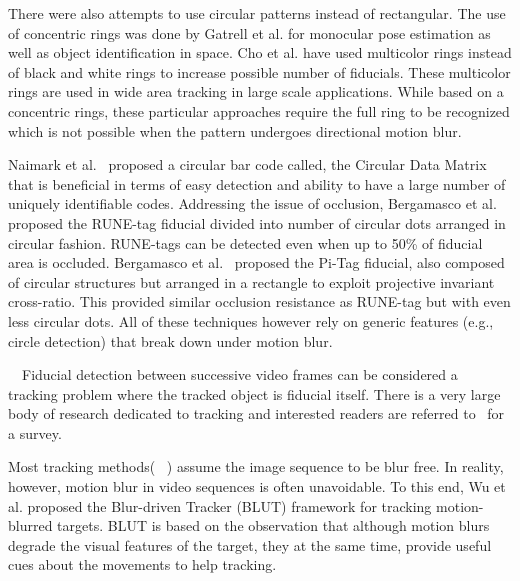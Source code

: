 \documentclass[runningheads]{llncs}
\begin{document}
There were also attempts to use circular patterns instead of rectangular. 
The use of concentric rings was done  by Gatrell et al.\cite{concentric}
for monocular pose estimation as well as object identification in space. Cho et al.
\cite{Cho:2001,Cho97fastcolor} have used multicolor rings instead of
black and white rings\cite{concentric} to increase possible number of fiducials.
These multicolor rings are used in wide area tracking in large scale
applications.  While based on a concentric rings, these particular approaches require 
the full ring to be recognized which is not possible when the pattern undergoes directional
motion blur.

Naimark et al.~\cite{NaimarkF02} proposed a circular bar code
called, the Circular Data Matrix that is beneficial in terms of
easy detection and ability to have a large number
of uniquely identifiable codes.  Addressing the issue of occlusion, 
Bergamasco et al. \cite{runetag11} proposed the RUNE-tag fiducial divided into number of
circular dots arranged in circular fashion.
RUNE-tags can be detected even when up to 50\% of fiducial area is occluded.
Bergamasco et al.~\cite{Pitag13} proposed the Pi-Tag fiducial, also composed 
of circular structures but arranged in a rectangle to exploit projective invariant cross-ratio.
This provided similar occlusion resistance as RUNE-tag but with even less
circular dots. All of these techniques however rely on generic features
(e.g., circle detection) that break down under motion blur.


~~Fiducial detection between successive video
frames can be considered a tracking problem where the tracked object is fiducial itself.
There is a very large body of research dedicated to tracking and interested
readers are referred to~\cite{Yilmaz:2006} for a survey.

Most tracking methods(~\cite{Ross:2008,Wu:2009,Perez02,Mei:2009} ) assume the
image sequence to be blur free. In reality, however, motion blur in video
sequences is often unavoidable. To this end, Wu et al.\cite{Wu:2011} proposed the
Blur-driven Tracker (BLUT) framework for tracking motion-blurred targets. BLUT
is based on the observation that although motion blurs degrade the visual
features of the target, they at the same time, provide useful cues about the
movements to help tracking.
\end{document}
